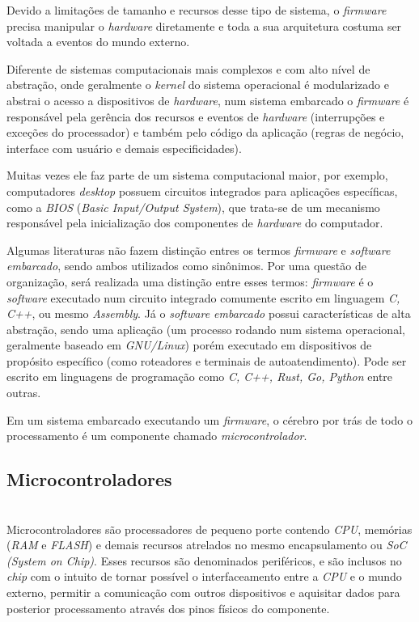 \documentclass[times, twoside, watermark]{artigo}
\begin{document}
Devido a limitações de tamanho e recursos desse tipo de sistema,
o \textit{firmware} precisa manipular o \textit{hardware} diretamente e toda a sua
arquitetura costuma ser voltada a eventos do mundo externo.

Diferente de sistemas computacionais mais complexos e com alto nível de abstração,
onde geralmente o \textit{kernel} do sistema operacional é modularizado e abstrai
o acesso a dispositivos de \textit{hardware}\cite{tanenbaum2015modern},
num sistema embarcado o \textit{firmware} é responsável pela gerência dos recursos
e eventos de \textit{hardware} (interrupções e exceções do processador) e também
pelo código da aplicação (regras de negócio, interface com usuário e demais
especificidades).

Muitas vezes ele faz parte de um sistema computacional maior,
por exemplo, computadores \textit{desktop} possuem circuitos integrados para
aplicações específicas, como a \textit{BIOS} (\textit{Basic Input/Output System}),
que trata-se de um mecanismo responsável pela inicialização dos
componentes de \textit{hardware} do computador. \cite{terzicbasic}

Algumas literaturas não fazem distinção entres os termos \textit{firmware} e
\textit{software embarcado}, sendo ambos utilizados como sinônimos. Por uma
questão de organização, será realizada uma distinção entre
esses termos: \textit{firmware} é o \textit{software} executado num circuito
integrado comumente escrito em linguagem \textit{C, C++}, ou mesmo \textit{Assembly}.
Já o \textit{software embarcado} possui características de alta abstração,
sendo uma aplicação (um processo rodando num sistema operacional,
geralmente baseado em \textit{GNU/Linux})\cite{simmonds2015mastering} porém executado
em dispositivos de propósito específico (como roteadores e terminais de
autoatendimento).
Pode ser escrito em linguagens de programação como \textit{C, C++, Rust, Go, Python}
entre outras.

Em um sistema embarcado executando um \textit{firmware}, o cérebro por trás de todo o
processamento é um componente chamado \textit{microcontrolador}.

\subsection{Microcontroladores}\hfill\\

Microcontroladores são processadores de pequeno porte contendo \textit{CPU},
memórias (\textit{RAM} e \textit{FLASH}) e demais
recursos atrelados no mesmo encapsulamento ou \textit{SoC (System on Chip)}.
Esses recursos são denominados periféricos, e são inclusos no \textit{chip}
com o intuito de tornar possível o interfaceamento entre a \textit{CPU}
e o mundo externo, permitir a comunicação com outros dispositivos e
aquisitar dados para posterior processamento através dos pinos físicos do componente.
\end{document}
